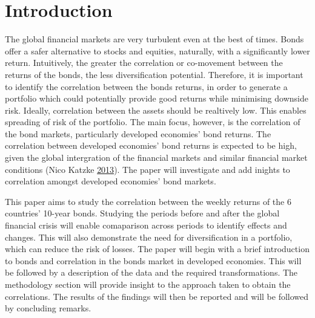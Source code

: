 \documentclass[11pt,preprint, authoryear]{elsarticle}
\numberwithin{equation}{section}
\numberwithin{figure}{section}
\numberwithin{table}{section}
\begin{document}
\pagestyle{fancy}
\chead{}
\lfoot{}
\lhead{}
\cfoot{}


\headsep 35pt %




\section{\texorpdfstring{Introduction
\label{Introduction}}{Introduction }}\label{introduction}

The global financial markets are very turbulent even at the best of
times. Bonds offer a safer alternative to stocks and equities,
naturally, with a significantly lower return. Intuitively, the greater
the correlation or co-movement between the returns of the bonds, the
less diversification potential. Therefore, it is important to identify
the correlation between the bonds returns, in order to generate a
portfolio which could potentially provide good returns while minimising
downside risk. Ideally, correlation between the assets should be
realtively low. This enables spreading of risk of the portfolio. The
main focus, however, is the correlation of the bond markets,
particularly developed economies' bond returns. The correlation between
developed economies' bond returns is expected to be high, given the
global intergration of the financial markets and similar financial
market conditions (Nico Katzke
\protect\hyperlink{ref-katzke2013}{2013}). The paper will investigate
and add inights to correlation amongst developed economies' bond
markets.

This paper aims to study the correlation between the weekly returns of
the 6 countries' 10-year bonds. Studying the periods before and after
the global financial crisis will enable comaparison across periods to
identify effects and changes. This will also demonstrate the need for
diversification in a portfolio, which can reduce the risk of losses. The
paper will begin with a brief introduction to bonds and correlation in
the bonds market in developed economies. This will be followed by a
description of the data and the required transformations. The
methodology section will provide insight to the approach taken to obtain
the correlations. The results of the findings will then be reported and
will be followed by concluding remarks.
\end{document}
